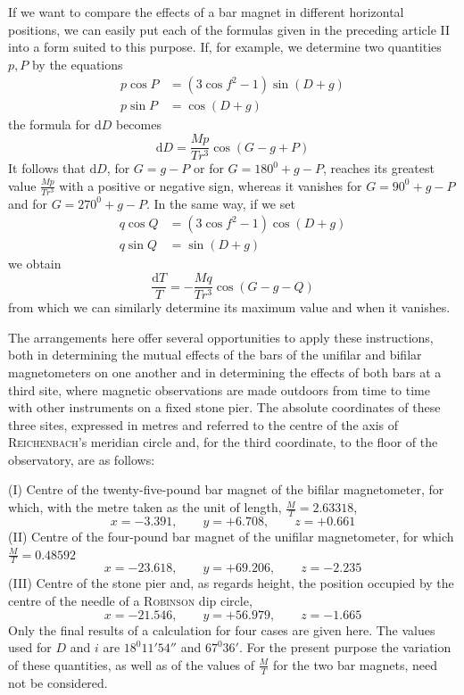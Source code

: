 If we want to compare the effects of a bar magnet in different horizontal positions, we can easily put each of the formulas given in the preceding article II into a form suited to this purpose. If, for example, we determine two quantities $p,P$ by the equations
\[
\begin{aligned}
p\cos P&=(3\cos f^2-1)\sin(D+g)\\
p\sin P&=\cos(D+g)
\end{aligned}
\]
the formula for $\mathrm{d}D$ becomes
\[
\mathrm{d}D=\frac{Mp}{Tr^3}\cos(G-g+P)
\]
It follows that $\mathrm{d}D$, for $G=g-P$ or for $G=180^0+g-P$, reaches its greatest value $\frac{Mp}{Tr^3}$ with a positive or negative sign, whereas it vanishes for $G=90^0+g-P$ and for $G=270^0+g-P$. In the same way, if we set
\[
\begin{aligned}
q\cos Q&=(3\cos f^2-1)\cos(D+g)\\
q\sin Q&=\sin(D+g)
\end{aligned}
\]
we obtain
\[
\frac{\mathrm{d}T}{T}=-\frac{Mq}{Tr^3}\cos(G-g-Q)
\]
from which we can similarly determine its maximum value and when it vanishes.

The arrangements here offer several opportunities to apply these instructions, both in determining the mutual effects of the bars of the unifilar and bifilar magnetometers on one another and in determining the effects of both bars at a third site, where magnetic observations are made outdoors from time to time with other instruments on a fixed stone pier. The absolute coordinates of these three sites, expressed in metres and referred to the centre
of the axis of \textsc{Reichenbach}’s meridian circle and, for the third coordinate, to the floor of the observatory, are as follows:

(I) Centre of the twenty-five-pound bar magnet of the bifilar magnetometer, for which, with the metre taken as the unit of length, $\frac{M}{T}=2.63318$,
\[
x=-3.391,\qquad y=+6.708,\qquad z=+0.661
\]
(II) Centre of the four-pound bar magnet of the unifilar magnetometer, for which $\frac{M}{T}=0.48592$
\[
x=-23.618,\qquad y=+69.206,\qquad z=-2.235
\]
(III) Centre of the stone pier and, as regards height, the position occupied by the centre of the needle of a \textsc{Robinson} dip circle,
\[
x=-21.546,\qquad y=+56.979,\qquad z=-1.665
\]
Only the final results of a calculation for four cases are given here. The values used for $D$ and $i$ are $18^0 11'54''$ and $67^0 36'$. For the present purpose the variation of these quantities, as well as of the values of $\frac{M}{T}$ for the two bar magnets, need not be considered.


